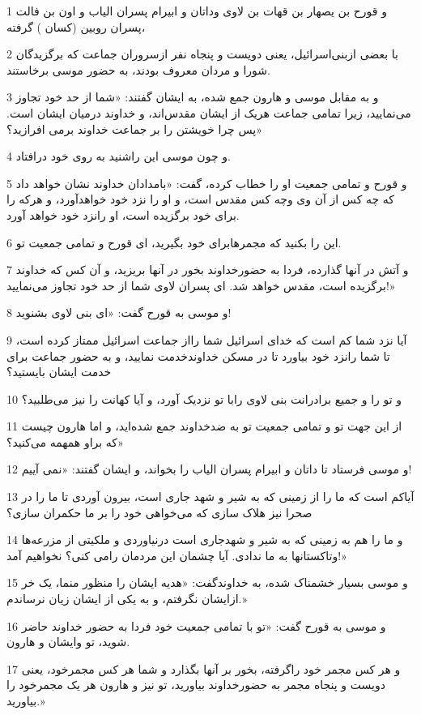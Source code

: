 \par 1 و قورح بن یصهار بن قهات بن لاوی وداتان و ابیرام پسران الیاب و اون بن فالت پسران روبین (کسان ) گرفته،
\par 2 با بعضی ازبنی‌اسرائیل، یعنی دویست و پنجاه نفر ازسروران جماعت که برگزیدگان شورا و مردان معروف بودند، به حضور موسی برخاستند.
\par 3 و به مقابل موسی و هارون جمع شده، به ایشان گفتند: «شما از حد خود تجاوز می‌نمایید، زیرا تمامی جماعت هریک از ایشان مقدس‌اند، و خداوند درمیان ایشان است. پس چرا خویشتن را بر جماعت خداوند برمی افرازید؟»
\par 4 و چون موسی این راشنید به روی خود درافتاد.
\par 5 و قورح و تمامی جمعیت او را خطاب کرده، گفت: «بامدادان خداوند نشان خواهد داد که چه کس از آن وی وچه کس مقدس است، و او را نزد خود خواهدآورد، و هرکه را برای خود برگزیده است، او رانزد خود خواهد آورد.
\par 6 این را بکنید که مجمرهابرای خود بگیرید، ای قورح و تمامی جمعیت تو.
\par 7 و آتش در آنها گذارده، فردا به حضورخداوند بخور در آنها بریزید، و آن کس که خداوند برگزیده است، مقدس خواهد شد. ای پسران لاوی شما از حد خود تجاوز می‌نمایید!»
\par 8 و موسی به قورح گفت: «ای بنی لاوی بشنوید!
\par 9 آیا نزد شما کم است که خدای اسرائیل شما رااز جماعت اسرائیل ممتاز کرده است، تا شما رانزد خود بیاورد تا در مسکن خداوندخدمت نمایید، و به حضور جماعت برای خدمت ایشان بایستید؟
\par 10 و تو را و جمیع برادرانت بنی لاوی رابا تو نزدیک آورد، و آیا کهانت را نیز می‌طلبید؟
\par 11 از این جهت تو و تمامی جمعیت تو به ضدخداوند جمع شده‌اید، و اما هارون چیست که براو همهمه می‌کنید؟»
\par 12 و موسی فرستاد تا داتان و ابیرام پسران الیاب را بخواند، و ایشان گفتند: «نمی آییم!
\par 13 آیاکم است که ما را از زمینی که به شیر و شهد جاری است، بیرون آوردی تا ما را در صحرا نیز هلاک سازی که می‌خواهی خود را بر ما حکمران سازی؟
\par 14 و ما را هم به زمینی که به شیر و شهدجاری است درنیاوردی و ملکیتی از مزرعه‌ها وتاکستانها به ما ندادی. آیا چشمان این مردمان رامی کنی؟ نخواهیم آمد!»
\par 15 و موسی بسیار خشمناک شده، به خداوندگفت: «هدیه ایشان را منظور منما، یک خر ازایشان نگرفتم، و به یکی از ایشان زیان نرساندم.»
\par 16 و موسی به قورح گفت: «تو با تمامی جمعیت خود فردا به حضور خداوند حاضر شوید، تو وایشان و هارون.
\par 17 و هر کس مجمر خود راگرفته، بخور بر آنها بگذارد و شما هر کس مجمرخود، یعنی دویست و پنجاه مجمر به حضورخداوند بیاورید، تو نیز و هارون هر یک مجمرخود را بیاورید.»
